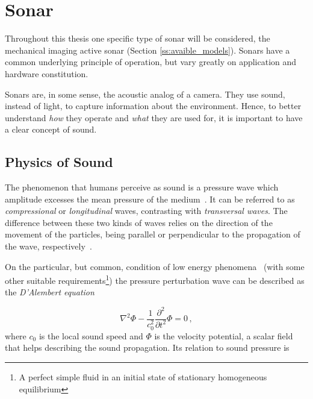 \section{Sonar}


Throughout this thesis one specific type of sonar will be considered, the
mechanical imaging active sonar (Section \ref{ss:avaible_models}). Sonars have a common
underlying principle of operation, but vary greatly on application and hardware
constitution.


Sonars are, in some sense, the acoustic analog of a camera. They use sound,
instead of light, to capture information about the environment. Hence, to better
understand \textit{how} they operate and \textit{what} they are used for, it is
important to have a clear concept of sound.

\subsection{Physics of Sound}

The phenomenon that humans perceive as sound is a pressure wave which
amplitude excesses the mean pressure of the medium~\cite{FEYNMAN}. It can be
referred to as \textit{compressional} or \textit{longitudinal} waves, contrasting with
\textit{transversal waves}. The difference between these two kinds of waves
relies on the direction of the movement of the particles, being parallel or
perpendicular to the propagation of the wave, respectively~\cite{BRUNEAU}.

On the particular, but common, condition of low energy
phenomena~\cite{Lefebvre} (with some other suitable requirements\footnote{A
perfect simple fluid in an initial state of stationary homogeneous equilibrium})
the pressure perturbation wave can be described as the \textit{D'Alembert
equation}
 
\begin{equation}\label{eq:lambert}
\nabla^2 \Phi - \frac{1}{c^2_0}\frac{\partial^2}{\partial t^2} \Phi = 0\,,
\end{equation}
%
where $c_0$
is the local sound speed and $\Phi$ is the velocity potential, a scalar field
that helps describing the sound propagation. Its relation to sound pressure is

